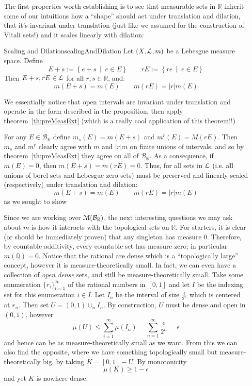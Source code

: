 \documentclass[oneside]{book}
\newcommand{\Q}{\mathbb{Q}}
\newcommand{\R}{\mathbb{R}}
\newcommand{\MM}{\EuScript{M}}
\newcommand{\EL}{\EuScript{L}}
\newcommand{\BB}{\mathcal{B}}
\newcommand{\set}[2]{\left\{#1 \ \middle|\ #2\right\}}
\begin{document}
The first properties worth establishing is to see that measurable sets in $\R$ inherit some of our intuitions how
a ``shape'' should act under translation and dilation, that it's invariant under translation (just like we assumed for
the construction of Vitali sets!) and it scales linearly with dilation:

\begin{prop}{Scaling and Dilation}{scalingAndDilation}
	Let $(X, \EL, m)$ be a Lebesgue measure space. Define
	\[
		E + s := \set{e+s}{e \in E} \qquad rE := \set{re}{e \in E}
	\]
	Then $E+s, rE \in \EL$ for all $r,s \in \R$, and:
	\[
		m(E+s) = m(E) \qquad m(rE) = |r|m(E)
	\]
\end{prop}

\begin{Proof}
	We essentially notice that open intervals are invariant under translation and operate in the form described in the
	proposition, then apply theorem~\ref{th:preMeasExt} (which is a really cool application of this theorem!!)

	For any $E \in \BB_\R$ define $m_s(E) = m(E + s)$ and $m^r(E) = M(rE)$. Then $m_s$ and $m^r$ clearly agree with $m$
	and $|r|m$ on finite unions of intervals, and so by theorem~\ref{th:preMeasExt} they agree on all of $\BB_\R$. As
	a consequence, if $m(E) = 0$, then $m(E+s) = m(rE) = 0$. Thus, for all sets in $\EL$ (i.e. all unions of borel sets
	and Lebesgue zero-sets) must be preserved and linearly scaled (respectively) under translation and dilation:
	\[
		m(E+s) = m(E) \qquad m(rE) = |r|m(E)
	\]
	as we sought to show
\end{Proof}

Since we are working over $\MM(\BB_\R)$, the next interesting questions we may ask about $m$ is how it interacts with
the topological sets on $\R$. For starters, it is clear (or should be immediately proven) that any singleton has measure
$0$. Therefore, by countable additivity, every countable set has measure zero; in particular $m(\Q) = 0$. Notice that
the rational are dense which is a ``topologically large'' concept, however it is measure-theoretically small. In fact, we can even have
a collection of \emph{open dense} sets, and still be measure-theoretically small. Take some enumeration
$\{r_i\}_{i=1}^\infty$ of the rational
numbers in $[0,1]$ and let $I$ be the indexing set for this enumeration $i \in I$. Let $I_n$ be the interval of size
$\frac{\epsilon}{2^n}$ which is centered at $r_n$. Then set $U = (0,1)\cup_n I_n$. By construction, $U$ must be dense and
open in $(0,1)$, however
\[
	\mu(U) \le \sum_{i=1}^\infty \mu(I_n) = \sum_{n=1}^\infty \frac{\epsilon}{2^n} = \epsilon
\]
and hence can be as measure-theoretically small as we want. From this we can also find the opposite, where we have
something topologically small but measure-theoretically big, by taking $K = [0,1] - U$. By monotonicity
\[
	\mu(K) \ge 1-\epsilon
\]
and yet $K$ is nowhere dense. 
\end{document}
